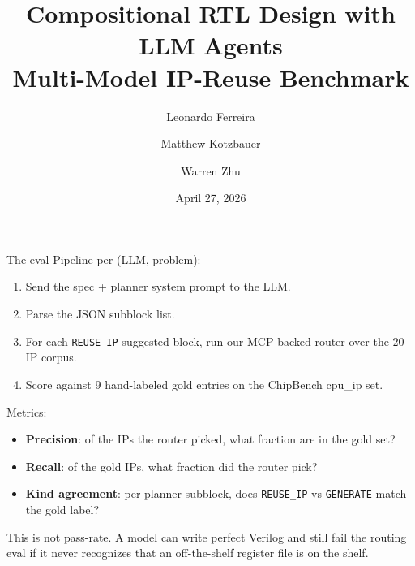 \documentclass[10pt]{beamer}
\title[Compositional RTL with LLM Agents]{Compositional RTL Design with LLM Agents\\[2pt]\large Multi-Model IP-Reuse Benchmark}
\author{Leonardo Ferreira \and Matthew Kotzbauer \and Warren Zhu}
\institute[Team 11]{Team 11 -- COMPSCI 1440R/2440R, Spring 2026 -- Final Presentation}
\date{April 27, 2026}
\newcommand{\blue}[1]{\textcolor{accent}{#1}}
\begin{document}
\begin{frame}
  \titlepage
\end{frame}

\begin{frame}{The eval}
  Pipeline per (LLM, problem):
  \vspace{0.3em}
  \begin{enumerate}
    \item Send the spec + planner system prompt to the LLM.
    \item Parse the JSON subblock list.
    \item For each \texttt{REUSE\_IP}-suggested block, run our MCP-backed router over the 20-IP corpus.
    \item Score against \blue{9 hand-labeled gold entries} on the ChipBench cpu\_ip set.
  \end{enumerate}

  \vspace{0.6em}
  Metrics:
  \begin{itemize}
    \item \textbf{Precision}: of the IPs the router picked, what fraction are in the gold set?
    \item \textbf{Recall}: of the gold IPs, what fraction did the router pick?
    \item \textbf{Kind agreement}: per planner subblock, does \texttt{REUSE\_IP} vs \texttt{GENERATE} match the gold label?
  \end{itemize}

  \vspace{0.4em}
  \footnotesize
  This is not pass-rate. A model can write perfect Verilog and still fail the routing eval if it never recognizes that an off-the-shelf register file is on the shelf.
\end{frame}
\end{document}
